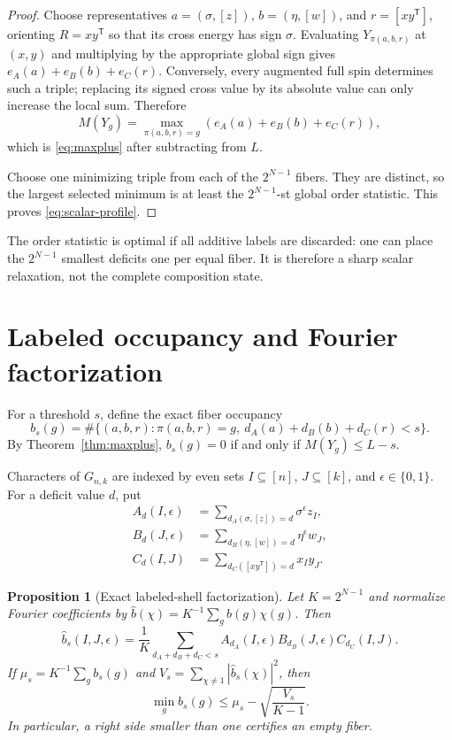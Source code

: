 \documentclass[11pt]{article}
\newcommand{\T}{\mathsf T}
\newtheorem{proposition}[theorem]{Proposition}
\theoremstyle{definition}
\theoremstyle{remark}
\begin{document}
\begin{proof}
Choose representatives $a=(\sigma,[z])$, $b=(\eta,[w])$, and
$r=[xy^{\T}]$, orienting $R=xy^{\T}$ so that its cross energy has sign
$\sigma$.  Evaluating $Y_{\pi(a,b,r)}$ at $(x,y)$ and multiplying by the
appropriate global sign gives
$e_A(a)+e_B(b)+e_C(r)$.  Conversely, every augmented full spin determines
such a triple; replacing its signed cross value by its absolute value can only
increase the local sum.  Therefore
\[
 M(Y_g)=\max_{\pi(a,b,r)=g}(e_A(a)+e_B(b)+e_C(r)),
\]
which is \eqref{eq:maxplus} after subtracting from $L$.

Choose one minimizing triple from each of the $2^{N-1}$ fibers.  They are
distinct, so the largest selected minimum is at least the
$2^{N-1}$-st global order statistic.  This proves
\eqref{eq:scalar-profile}.
\end{proof}

The order statistic is optimal if all additive labels are discarded: one can
place the $2^{N-1}$ smallest deficits one per equal fiber.  It is therefore a
sharp scalar relaxation, not the complete composition state.

\section{Labeled occupancy and Fourier factorization}

For a threshold $s$, define the exact fiber occupancy
\begin{equation}
 b_s(g)=\#\{(a,b,r):\pi(a,b,r)=g,\ d_A(a)+d_B(b)+d_C(r)<s\}.
                                                               \label{eq:occupancy}
\end{equation}
By Theorem~\ref{thm:maxplus}, $b_s(g)=0$ if and only if
$M(Y_g)\le L-s$.

Characters of $G_{n,k}$ are indexed by even sets
$I\subseteq[n]$, $J\subseteq[k]$, and $\epsilon\in\{0,1\}$.  For a deficit
value $d$, put
\begin{align*}
 A_d(I,\epsilon)&=\sum_{d_A(\sigma,[z])=d}\sigma^\epsilon z_I,\\
 B_d(J,\epsilon)&=\sum_{d_B(\eta,[w])=d}\eta^\epsilon w_J,\\
 C_d(I,J)&=\sum_{d_C([xy^{\T}])=d}x_Iy_J.
\end{align*}

\begin{proposition}[Exact labeled-shell factorization]
Let $K=2^{N-1}$ and normalize Fourier coefficients by
$\widehat b(\chi)=K^{-1}\sum_gb(g)\chi(g)$.  Then
\begin{equation}
 \widehat b_s(I,J,\epsilon)=\frac1K
 \sum_{d_A+d_B+d_C<s}
 A_{d_A}(I,\epsilon)B_{d_B}(J,\epsilon)C_{d_C}(I,J).    \label{eq:fourier-shell}
\end{equation}
If $\mu_s=K^{-1}\sum_gb_s(g)$ and
$V_s=\sum_{\chi\ne1}|\widehat b_s(\chi)|^2$, then
\begin{equation}
 \min_gb_s(g)\le\mu_s-\sqrt{\frac{V_s}{K-1}}.          \label{eq:parseval}
\end{equation}
In particular, a right side smaller than one certifies an empty fiber.
\end{proposition}
\end{document}
